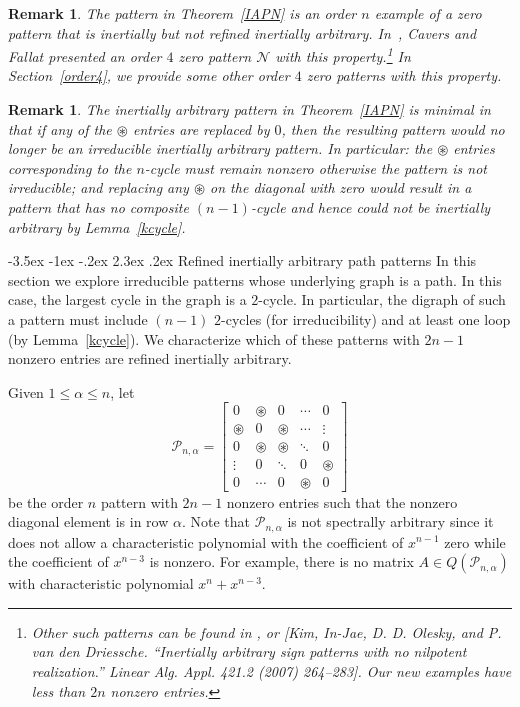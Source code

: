 \documentclass[10pt]{amsart}
\newtheorem{remark}[proposition]{Remark}
\begin{document}
\begin{remark}{\rm
The pattern in Theorem~\ref{IAPN} is an order $n$ example of a zero pattern that is inertially but not refined inertially
arbitrary. In~\cite{CF}, Cavers and Fallat presented an order $4$ zero pattern ${\mathcal{N}}$ with this property.\footnote{Other such patterns can be found in \cite{CVV}, or 
[Kim, In-Jae, D. D. Olesky, and P. van den Driessche. ``Inertially arbitrary sign patterns with no nilpotent realization.''
\emph{Linear Alg. Appl.} 421.2 (2007) 264--283].  Our new examples have less than $2n$ nonzero entries.}
In Section~\ref{order4}, we provide some other order $4$ zero patterns with this property.
}\end{remark}

\begin{remark} {\rm
The inertially arbitrary pattern in Theorem~\ref{IAPN} is \emph{minimal} in that if any of the ${\circledast}$ entries are replaced by $0$, then the resulting pattern would no longer be an irreducible inertially arbitrary pattern. 
In particular: the ${\circledast}$ entries corresponding to the $n$-cycle must remain nonzero otherwise the pattern is not irreducible; and replacing any ${\circledast}$ on the diagonal 
with zero 
would result in a pattern that has no composite $(n-1)$-cycle and hence could not be
inertially arbitrary by Lemma~\ref{kcycle}.
}\end{remark}

{               
                                      {-3.5ex \@plus -1ex \@minus -.2ex}                                      {2.3ex \@plus.2ex}                                                      {\normalfont\bfseries}}{Refined inertially arbitrary path patterns}\label{pathsection}
In this section we explore irreducible patterns whose underlying graph is a path. In this case, the largest cycle in the
graph is a $2$-cycle. In particular, the digraph of such a pattern must 
include $(n-1)$ $2$-cycles (for irreducibility) and at least one loop (by Lemma~\ref{kcycle}). We characterize which
of these patterns with $2n-1$ nonzero entries are refined inertially arbitrary. 

Given $1\leq \alpha \leq n$, let 
$${\mathcal{P}}_{n, \alpha} = \left[ \begin{array}{ccccc}
0    	& {\circledast} & 0			& \cdots  	& 0\\
{\circledast} 	& 0 & {\circledast}		& \cdots  	& \vdots\\
0 		& {\circledast}	& {\circledast}  	&\ddots  	&0\\
\vdots	& 0		& \ddots  	& 0 		&{\circledast}\\
0   	&\cdots &0  	    & {\circledast}  	&0\end{array} \right]$$ 
be the order $n$ pattern with $2n-1$ nonzero entries such that the nonzero diagonal element is in row $\alpha$. 
Note that ${\mathcal{P}}_{n,\alpha}$ is not spectrally arbitrary since it does not allow a characteristic polynomial with
the coefficient of $x^{n-1}$ zero while the coefficient of $x^{n-3}$ is nonzero. 
For example, there is no matrix $A\in Q({\mathcal{P}}_{n,\alpha})$ with characteristic polynomial $x^n+x^{n-3}$.
\end{document}
